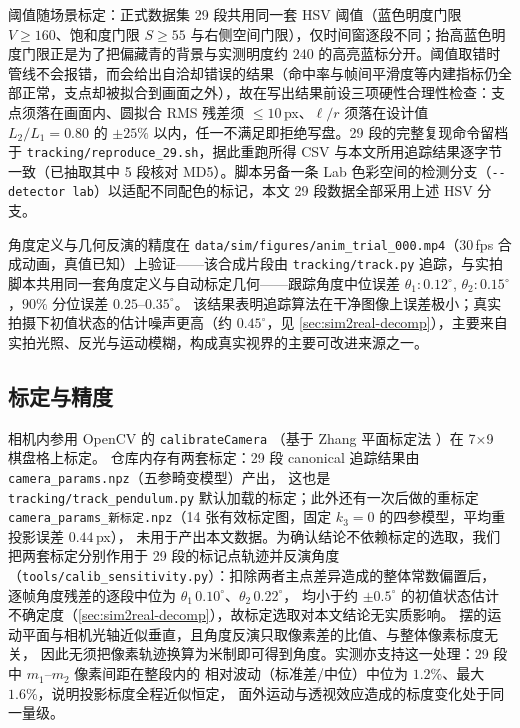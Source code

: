 \documentclass[a4paper,12pt]{ctexart}   %
\let\cite\supercite   %
\newcommand{\thetaone}{\theta_1}
\newcommand{\thetatwo}{\theta_2}
\begin{document}
阈值随场景标定：正式数据集 29 段共用同一套 HSV 阈值（蓝色明度门限 $V \geq 160$、饱和度门限 $S \geq 55$ 与右侧空间门限），仅时间窗逐段不同；抬高蓝色明度门限正是为了把偏藏青的背景与实测明度约 $240$ 的高亮蓝标分开。阈值取错时管线不会报错，而会给出自洽却错误的结果（命中率与帧间平滑度等内建指标仍全部正常，支点却被拟合到画面之外），故在写出结果前设三项硬性合理性检查：支点须落在画面内、圆拟合 RMS 残差须 $\leq 10$\,px、$\ell / r$ 须落在设计值 $L_2 / L_1 = 0.80$ 的 $\pm 25\%$ 以内，任一不满足即拒绝写盘。29 段的完整复现命令留档于 \texttt{tracking/reproduce\_29.sh}，据此重跑所得 CSV 与本文所用追踪结果逐字节一致（已抽取其中 5 段核对 MD5）。脚本另备一条 Lab 色彩空间的检测分支（\texttt{-{}-detector lab}）以适配不同配色的标记，本文 29 段数据全部采用上述 HSV 分支。

角度定义与几何反演的精度在 \texttt{data/sim/figures/anim\_trial\_000.mp4}（30\,fps 合成动画，真值已知）上验证——该合成片段由 \texttt{tracking/track.py} 追踪，与实拍脚本共用同一套角度定义与自动标定几何——跟踪角度中位误差
$\thetaone : 0.12^\circ$, $\thetatwo : 0.15^\circ$，$90\%$ 分位误差 $0.25\text{--}0.35^\circ$。
该结果表明追踪算法在干净图像上误差极小；真实拍摄下初值状态的估计噪声更高（约 $0.45^\circ$，见 \cref{sec:sim2real-decomp}），主要来自实拍光照、反光与运动模糊，构成真实视界的主要可改进来源之一。

\subsection{标定与精度}
相机内参用 OpenCV 的 \texttt{calibrateCamera} \cite{bradski2000}（基于 Zhang 平面标定法 \cite{zhang2000}）在 7$\times$9 棋盘格上标定。
仓库内存有两套标定：29 段 canonical 追踪结果由 \texttt{camera\_params.npz}（五参畸变模型）产出，
这也是 \texttt{tracking/track\_pendulum.py} 默认加载的标定；此外还有一次后做的重标定
\texttt{camera\_params\_新标定.npz}（14 张有效标定图，固定 $k_3 = 0$ 的四参模型，平均重投影误差 $0.44$\,px），
未用于产出本文数据。为确认结论不依赖标定的选取，我们把两套标定分别作用于 29 段的标记点轨迹并反演角度
（\texttt{tools/calib\_sensitivity.py}）：扣除两者主点差异造成的整体常数偏置后，
逐帧角度残差的逐段中位为 $\thetaone\,0.10^\circ$、$\thetatwo\,0.22^\circ$，
均小于约 $\pm 0.5^\circ$ 的初值状态估计不确定度（\cref{sec:sim2real-decomp}），故标定选取对本文结论无实质影响。
摆的运动平面与相机光轴近似垂直，且角度反演只取像素差的比值、与整体像素标度无关，
因此无须把像素轨迹换算为米制即可得到角度。实测亦支持这一处理：29 段中 $m_1$--$m_2$ 像素间距在整段内的
相对波动（标准差/中位）中位为 $1.2\%$、最大 $1.6\%$，说明投影标度全程近似恒定，
面外运动与透视效应造成的标度变化处于同一量级。
\end{document}
